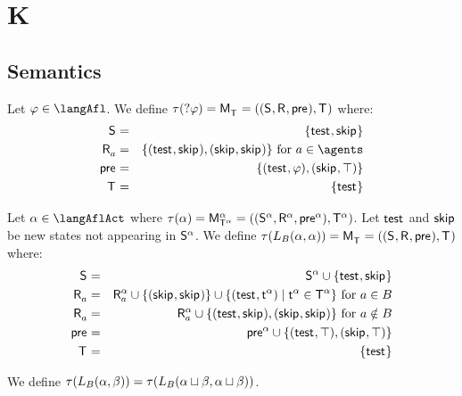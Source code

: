 \section{K}

\subsection{Semantics}

\begin{definition}[Test]\label{afl-k-test}
Let $\phi \in \langAfl$. 
We define $\tau(\test{\phi}) = \aPModel{\aStatesT} = \aPModelTuple{\aStatesT}$ where:
\begin{eqnarray*}
    \aStates &=& \{\aStateTest, \aStateSkip\}\\
    \aAccessibility{\agentA} &=& \{(\aStateTest, \aStateSkip), (\aStateSkip, \aStateSkip)\} \text{ for } \agentA \in \agents\\
    \aPrecondition &=& \{(\aStateTest, \phi), (\aStateSkip, \top)\}\\
    \aStatesT &=& \{\aStateTest\}
\end{eqnarray*}
\end{definition}

\begin{definition}[Learning]\label{afl-k-learning}
Let $\alpha \in \langAflAct$ where $\tau(\alpha) = \aPModel[\alpha]{\aStatesT[\alpha]} = \aPModelTuple[\alpha]{\aStatesT[\alpha]}$.
Let $\aStateTest$ and $\aStateSkip$ be new states not appearing in $\aStates[\alpha]$.
We define $\tau(\learnsBs (\alpha, \alpha)) = \aPModel{\aStatesT} = \aPModelTuple{\aStatesT}$ where:
\begin{eqnarray*}
    \aStates &=& \aStates[\alpha] \cup \{\aStateTest, \aStateSkip\}\\
    \aAccessibility{\agentA} &=& \aAccessibility[\alpha]{\agentA} \cup \{(\aStateSkip, \aStateSkip)\} \cup \{(\aStateTest, \aStateT[\alpha]) \mid \aStateT[\alpha] \in \aStatesT[\alpha]\} \text{ for } \agentA \in \agentsB\\
    \aAccessibility{\agentA} &=& \aAccessibility[\alpha]{\agentA} \cup \{(\aStateTest, \aStateSkip), (\aStateSkip, \aStateSkip)\} \text{ for } \agentA \notin \agentsB\\
    \aPrecondition &=& \aPrecondition[\alpha] \cup \{(\aStateTest, \top), (\aStateSkip, \top)\}\\
    \aStatesT &=& \{\aStateTest\}
\end{eqnarray*}

We define $\tau(\learnsBs (\alpha, \beta)) = \tau(\learnsBs (\alpha \choice \beta, \alpha \choice \beta))$.
\end{definition}

